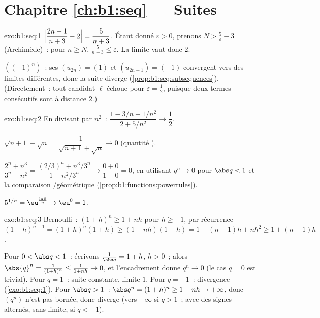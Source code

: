 \section*{Chapitre \ref{ch:b1:seq} --- Suites}

\begin{solution}{exo:b1:seq:1}
$\Bigl|\dfrac{2n+1}{n+3} - 2\Bigr| = \dfrac{5}{n+3}$. Étant donné
$\varepsilon > 0$, prenons $N > \frac 5\varepsilon - 3$ (Archimède)~:
pour $n \geq N$, $\frac{5}{n+3} \leq \varepsilon$. La limite vaut donc
$2$.

$((-1)^n)$~: ses  $(u_{2n}) = (1)$ et $(u_{2n+1}) =
(-1)$ convergent vers des limites différentes, donc la suite diverge
(\cref{prop:b1:seq:subsequences}). (Directement~: tout candidat $\ell$
échoue pour $\varepsilon = \frac12$, puisque deux termes consécutifs
sont à distance $2$.)
\end{solution}

\begin{solution}{exo:b1:seq:2}
En divisant par $n^2$~: $\dfrac{1 - 3/n + 1/n^2}{2 + 5/n^2} \to
\dfrac12$.

$\sqrt{n+1} - \sqrt n = \dfrac{1}{\sqrt{n+1} + \sqrt n} \to 0$
(quantité ).

$\dfrac{2^n + n^3}{3^n - n^2} = \dfrac{(2/3)^n + n^3/3^n}{1 -
n^2/3^n} \to \dfrac{0 + 0}{1 - 0} = 0$, en utilisant $q^n \to 0$ pour
$\abs q < 1$ et la comparaison /géométrique
(\cref{prop:b1:functions:powerrules}).

$5^{1/n} = \eu^{\frac{\ln 5}{n}} \to \eu^0 = 1$.
\end{solution}

\begin{solution}{exo:b1:seq:3}
Bernoulli~: $(1+h)^n \geq 1 + nh$ pour $h \geq -1$, par récurrence ---
$(1+h)^{n+1} = (1+h)^n(1+h) \geq (1+nh)(1+h) = 1 + (n+1)h + nh^2
\geq 1 + (n+1)h$.

Pour $0 < \abs q < 1$~: écrivons $\frac{1}{\abs q} = 1 + h$, $h > 0$~;
alors $\abs{q}^n = \frac{1}{(1+h)^n} \leq \frac{1}{1 + nh} \to 0$, et
l'encadrement donne $q^n \to 0$ (le cas $q = 0$ est trivial). Pour $q
= 1$~: suite constante, limite $1$. Pour $q = -1$~: divergence
(\cref{exo:b1:seq:1}). Pour $\abs q > 1$~: $\abs q^n = (1 + h)^n \geq
1 + nh \to +\infty$, donc $(q^n)$ n'est pas bornée, donc diverge (vers
$+\infty$ si $q > 1$~; avec des signes alternés, sans limite, si $q <
-1$).
\end{solution}

